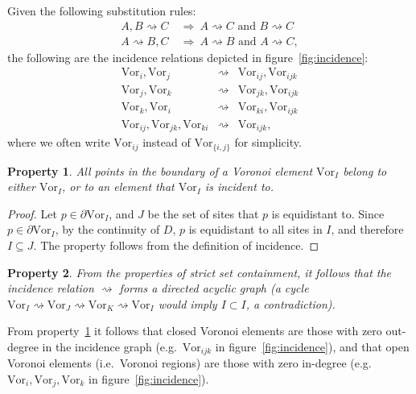 \documentclass[11pt]{article}
\newtheorem{property}{Property}
\newcommand{\Vor}{\text{Vor}}
\begin{document}
Given the following substitution rules:
\begin{eqnarray*}
	A,B\rightsquigarrow C ~&\Rightarrow~  A\rightsquigarrow C \text{ and } B\rightsquigarrow C \\
	A \rightsquigarrow B,C ~&\Rightarrow~ A\rightsquigarrow B \text{ and } A\rightsquigarrow C, 
\end{eqnarray*}
the following are the incidence relations depicted in figure~\ref{fig:incidence}: 
\begin{eqnarray*}
	\Vor_i,\Vor_j &\rightsquigarrow& \Vor_{ij},\Vor_{ijk} \\
	\Vor_j,\Vor_k &\rightsquigarrow& \Vor_{jk},\Vor_{ijk} \\
	\Vor_k,\Vor_i &\rightsquigarrow& \Vor_{ki},\Vor_{ijk} \\
	\Vor_{ij},\Vor_{jk},\Vor_{ki} &\rightsquigarrow& \Vor_{ijk}, 
\end{eqnarray*}
where we often write $\Vor_{ij}$ instead of $\Vor_{\{i,j\}}$ for simplicity. 




\begin{property}\label{prop:boundaryincidence}
	All points in the boundary of a Voronoi element $\Vor_I$ belong to either $\Vor_I$, 
		or to an element that $\Vor_I$ is incident to. \end{property}
\begin{proof}
	Let $p\in\partial\Vor_I$, and $J$ be the set of sites that $p$ is equidistant to. 
	Since $p\in\partial\Vor_I$, by the continuity of $D$, $p$ is equidistant to all sites in $I$, 
		and therefore $I\subseteq J$. 
	The property follows from the definition of incidence. 
\end{proof}


\begin{property}
	From the properties of strict set containment, 
		it follows that the incidence relation $\rightsquigarrow$ forms a directed acyclic graph  
	(a cycle $\Vor_I\rightsquigarrow\Vor_J\rightsquigarrow\Vor_K\rightsquigarrow\Vor_I$ would imply $I\subset I$, a contradiction). 
\end{property}



From property~\ref{prop:boundaryincidence} it follows that closed Voronoi elements 
	are those with zero out-degree in the incidence graph (e.g.\ $\Vor_{ijk}$ in figure~\ref{fig:incidence}), 
and that open Voronoi elements (i.e.\ Voronoi regions) are those with zero in-degree 
	(e.g.\ $\Vor_i,\Vor_j,\Vor_k$ in figure~\ref{fig:incidence}). 
\end{document}
